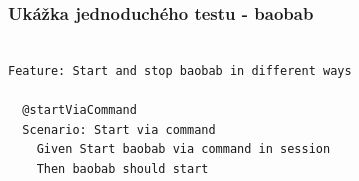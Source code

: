 \documentclass[10pt,xcolor=pdflatex,hyperref={unicode}]{beamer}
\begin{document}
\begin{frame}[fragile]\frametitle{Ukážka jednoduchého testu - baobab}

\begin{lstlisting}[language=Gherkin]

Feature: Start and stop baobab in different ways

  @startViaCommand
  Scenario: Start via command
    Given Start baobab via command in session
    Then baobab should start
\end{lstlisting}
\begin{figure}[h]
    \label{diagram}
\end{figure}

\end{frame}


\end{document}
